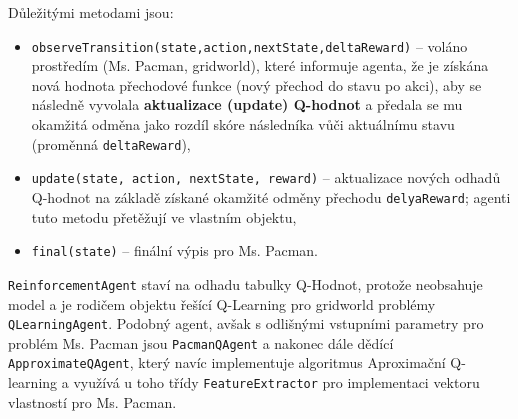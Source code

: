 Důležitými metodami jsou:
\begin{itemize}
\item \texttt{observeTransition(state,action,nextState,deltaReward)} -- voláno prostředím (Ms. Pacman, gridworld), které informuje agenta, že je získána nová hodnota přechodové funkce (nový přechod do stavu po akci), aby se následně vyvolala \textbf{aktualizace (update) Q-hodnot} a předala se mu okamžitá odměna jako rozdíl skóre následníka vůči aktuálnímu stavu (proměnná \texttt{deltaReward}),
\item \texttt{update(state, action, nextState, reward)} -- aktualizace nových odhadů Q-hodnot na základě získané okamžité odměny přechodu \texttt{delyaReward}; agenti tuto metodu přetěžují ve vlastním objektu,
\item \texttt{final(state)} -- finální výpis pro Ms. Pacman.
\end{itemize}
\texttt{ReinforcementAgent} staví na odhadu tabulky Q-Hodnot, protože neobsahuje model a je rodičem objektu řešící Q-Learning pro gridworld problémy \texttt{QLearningAgent}. Podobný agent, avšak s odlišnými vstupními parametry pro problém Ms. Pacman jsou \texttt{PacmanQAgent} a nakonec dále dědící \texttt{ApproximateQAgent}, který navíc implementuje algoritmus Aproximační Q-learning a využívá u toho třídy \texttt{FeatureExtractor} pro implementaci vektoru vlastností pro Ms. Pacman.

